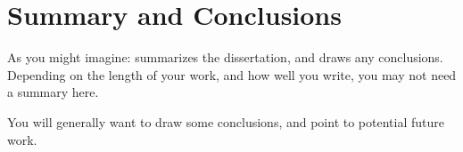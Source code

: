 \documentclass[a4paper,12pt,twoside,openright]{report}
\begin{document}
\chapter{Summary and Conclusions} 

As you might imagine: summarizes the dissertation, and draws 
any conclusions. Depending on the length of your work, and 
how well you write, you may not need a summary here. 

You will generally want to draw some conclusions, and point
to potential future work. 




\appendix
\singlespacing

 
 
\end{document}
